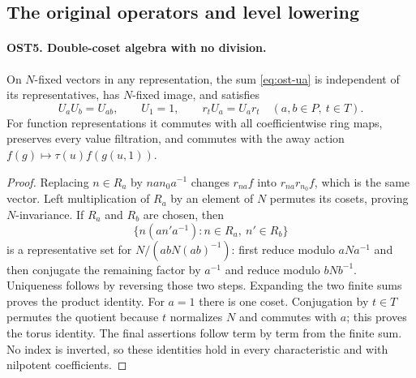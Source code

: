 \subsection{The original operators and level lowering}

\paragraph{OST5. Double-coset algebra with no division.}
\label{claim:OST5}
On $N$-fixed vectors in any representation, the sum
\eqref{eq:ost-ua} is independent of its representatives, has
$N$-fixed image, and satisfies
\[
 U_aU_b=U_{ab},\qquad U_1=1,\qquad r_tU_a=U_a r_t
                    \quad(a,b\in P,\ t\in T).
\]
For function representations it commutes with all coefficientwise
ring maps, preserves every value filtration, and commutes with
the away action $f(g)\mapsto\tau(u)f(g(u,1))$.
\begin{proof}
Replacing $n\in R_a$ by $n a n_0a^{-1}$ changes
$r_{na}f$ into $r_{na}r_{n_0}f$, which is the same vector.
Left multiplication of $R_a$ by an element of $N$ permutes its
cosets, proving $N$-invariance.  If $R_a$ and $R_b$ are chosen,
then
\[
             \{n(a n'a^{-1}):n\in R_a,\ n'\in R_b\}
\]
is a representative set for $N/(abN(ab)^{-1})$: first reduce
modulo $aNa^{-1}$ and then conjugate the remaining factor by
$a^{-1}$ and reduce modulo $bNb^{-1}$.  Uniqueness follows
by reversing those two steps.  Expanding the two finite sums
proves the product identity.  For $a=1$ there is one coset.
Conjugation by $t\in T$ permutes the quotient because $t$
normalizes $N$ and commutes with $a$; this proves the torus
identity.  The final assertions follow term by term from the
finite sum.  No index is inverted, so these identities hold in
every characteristic and with nilpotent coefficients.
\end{proof}


